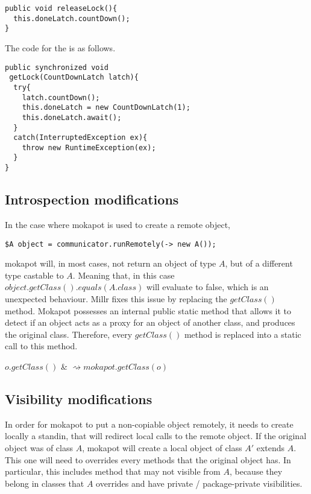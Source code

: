 \documentclass[a4paper, 11pt, english]{article}
\begin{document}
\begin{lstlisting}
public void releaseLock(){
  this.doneLatch.countDown();
}
\end{lstlisting}



 The code for the \getLock{} is as follows.



\begin{lstlisting}
public synchronized void 
 getLock(CountDownLatch latch){
  try{
    latch.countDown();
    this.doneLatch = new CountDownLatch(1);
    this.doneLatch.await();
  }
  catch(InterruptedException ex){
    throw new RuntimeException(ex);
  }
}
\end{lstlisting}



\subsection{Introspection modifications}

In the case where mokapot is used to create a remote object,
\begin{lstlisting}
$A object = communicator.runRemotely(-> new A());
\end{lstlisting}
mokapot will, in most cases, not return an object of type $A$, but of a different type castable to $A$. Meaning that, in this case $object.getClass().equals(A.class)$ will evaluate to false, which is an unexpected behaviour. Millr fixes this issue by replacing the $getClass()$ method. Mokapot possesses an internal public static method that allows it to detect if an object acts as a proxy for an object of another class, and produces the original class.
Therefore, every $getClass()$ method is replaced into a static call to this method.

\begin{tabular}
$o.getClass() $ & $\rightsquigarrow mokapot.getClass(o)$
\end{tabular} 





\subsection{Visibility modifications}

In order for mokapot to put a non-copiable object remotely, it needs to create locally a standin, that will redirect local calls to the remote object. If the original object was of class $A$, mokapot will create a local object of class $A'$ extends $A$. This one will need to overrides every methods that the original object has. In particular, this includes method that may not visible from $A$, because they belong in classes that $A$ overrides and have private / package-private visibilities.
\end{document}
